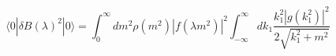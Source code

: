 \begin{equation}
\langle 0| \delta B(\lambda)^2 |0 \rangle 
 = \int_0 ^{\infty} \!\!\!\!dm^2 \rho(m^2) |f(\lambda m^2)|^2
\int_{-\infty} ^\infty dk_1 
\frac{k_1^2 |g(k_1^2)|^2}{2 \sqrt{k_1^2+m^2}} 
\label{limitensor}
\end{equation}

